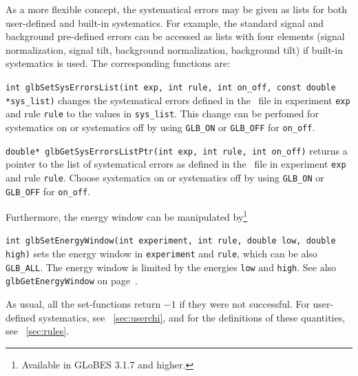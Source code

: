 %
As a more flexible concept, the systematical errors may be given as lists for
both user-defined and built-in systematics. For example, the standard signal and background
pre-defined errors can be accessed as lists with four elements (signal
normalization, signal tilt, background normalization, background tilt) if built-in
systematics is used. The corresponding 
functions are:
\begin{function}
{\tt int glbSetSysErrorsList(int exp, int rule, int on\_off, const double *sys\_list)}
changes the systematical errors defined in the \AEDL\ file in experiment {\tt exp} and 
rule {\tt rule} to the values in {\tt sys\_list}. This change can be perfomed for
systematics on or systematics off by using {\tt GLB\_ON} or {\tt GLB\_OFF} for {\tt on\_off}. 
\end{function}
\begin{function}
{\tt double* glbGetSysErrorsListPtr(int exp, int rule, int on\_off)}
returns a pointer to the list of systematical errors as defined in the \AEDL\ file in experiment {\tt exp} and 
rule {\tt rule}. Choose
systematics on or systematics off by using {\tt GLB\_ON} or {\tt GLB\_OFF} for {\tt on\_off}. 
\end{function}
Furthermore, the energy window can be manipulated by\footnote{Available in GLoBES 3.1.7 and higher.}
\begin{function}
 \label{glbSetEnergyWindow}
{\tt int glbSetEnergyWindow(int experiment, int rule, double low, double high)}
sets the energy window in {\tt experiment} and {\tt rule}, which can be also {\tt GLB\_ALL}. The energy window is limited by the energies {\tt low} and {\tt high}. See also {\tt glbGetEnergyWindow} on page~\pageref{glbGetEnergyWindow}.
\end{function}
As usual, all the set-functions return $-1$ if they were not successful.
For user-defined systematics, see \Sec~\ref{sec:userchi}, and 
for the definitions of these quantities, see \Sec~\ref{sec:rules}. 

